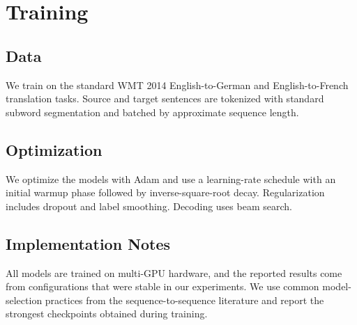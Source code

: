 \section{Training}

\subsection{Data}

We train on the standard WMT 2014 English-to-German and English-to-French translation tasks. Source and target sentences are tokenized with standard subword segmentation and batched by approximate sequence length.

\subsection{Optimization}

We optimize the models with Adam and use a learning-rate schedule with an initial warmup phase followed by inverse-square-root decay. Regularization includes dropout and label smoothing. Decoding uses beam search.

\subsection{Implementation Notes}

All models are trained on multi-GPU hardware, and the reported results come from configurations that were stable in our experiments. We use common model-selection practices from the sequence-to-sequence literature and report the strongest checkpoints obtained during training.
